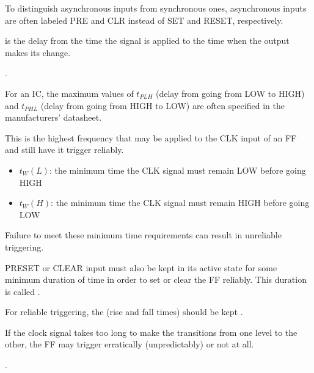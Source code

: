     \par To distinguish asynchronous inputs from synchronous ones,
      asynchronous inputs are often labeled PRE and CLR instead of SET and
      RESET, respectively.



    \par {} is the delay from the time the signal is
    applied to the time when the output makes its change.
    \par {}.
    \par For an IC, the maximum values of $t_{PLH}$ (delay from going from
    LOW to HIGH) and $t_{PHL}$ (delay from going from HIGH to LOW) are often
    specified in the manufacturers' datasheet.

    \par This is the highest frequency that may be applied to the CLK input
    of an FF and still have it trigger reliably.

    \begin{itemize}
      \item $t_W (L)$: the minimum time the CLK signal must remain LOW before
        going HIGH
      \item $t_W (H)$: the minimum time the CLK signal must remain HIGH before
        going LOW
    \end{itemize}
    \par Failure to meet these minimum time requirements can result in
    unreliable triggering.
    \par {}

    \par PRESET or CLEAR input must also be kept in its active state for
    some minimum duration of time in order to set or clear the FF reliably.
    This duration is called .

    \par For reliable triggering, the 
      (rise and fall times) should be kept .
    \par If the clock signal takes too long to make the transitions from one
      level to the other, the FF may trigger erratically (unpredictably) or
      not at all.


  \par {}.
